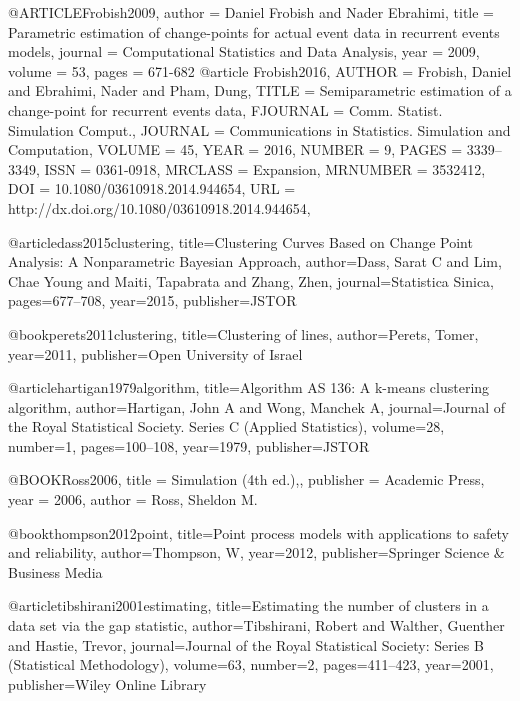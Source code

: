 @ARTICLE{Frobish2009,
  author = {Daniel Frobish and Nader Ebrahimi},
  title = {Parametric estimation of change-points for actual event data in recurrent events models},
  journal = {Computational Statistics and Data Analysis},
  year = {2009},
  volume = {53},
  pages = {671-682}
}
@article {Frobish2016,
    AUTHOR = {Frobish, Daniel and Ebrahimi, Nader and Pham, Dung},
     TITLE = {Semiparametric estimation of a change-point for recurrent
              events data},
   FJOURNAL = {Comm. Statist. Simulation Comput.},
  JOURNAL = {Communications in Statistics. Simulation and Computation},
    VOLUME = {45},
      YEAR = {2016},
    NUMBER = {9},
     PAGES = {3339--3349},
      ISSN = {0361-0918},
   MRCLASS = {Expansion},
  MRNUMBER = {3532412},
       DOI = {10.1080/03610918.2014.944654},
       URL = {http://dx.doi.org/10.1080/03610918.2014.944654},
}

@article{dass2015clustering,
  title={Clustering Curves Based on Change Point Analysis: A Nonparametric Bayesian Approach},
  author={Dass, Sarat C and Lim, Chae Young and Maiti, Tapabrata and Zhang, Zhen},
  journal={Statistica Sinica},
  pages={677--708},
  year={2015},
  publisher={JSTOR}
}

@book{perets2011clustering,
  title={Clustering of lines},
  author={Perets, Tomer},
  year={2011},
  publisher={Open University of Israel}
}

@article{hartigan1979algorithm,
  title={Algorithm AS 136: A k-means clustering algorithm},
  author={Hartigan, John A and Wong, Manchek A},
  journal={Journal of the Royal Statistical Society. Series C (Applied Statistics)},
  volume={28},
  number={1},
  pages={100--108},
  year={1979},
  publisher={JSTOR}
}

@BOOK{Ross2006,
    title = {Simulation (4th ed.),},
    publisher = {Academic Press},
    year = {2006},
    author = {Ross, Sheldon M.}
  }

@book{thompson2012point,
  title={Point process models with applications to safety and reliability},
  author={Thompson, W},
  year={2012},
  publisher={Springer Science \& Business Media}
}

@article{tibshirani2001estimating,
  title={Estimating the number of clusters in a data set via the gap statistic},
  author={Tibshirani, Robert and Walther, Guenther and Hastie, Trevor},
  journal={Journal of the Royal Statistical Society: Series B (Statistical Methodology)},
  volume={63},
  number={2},
  pages={411--423},
  year={2001},
  publisher={Wiley Online Library}
}

